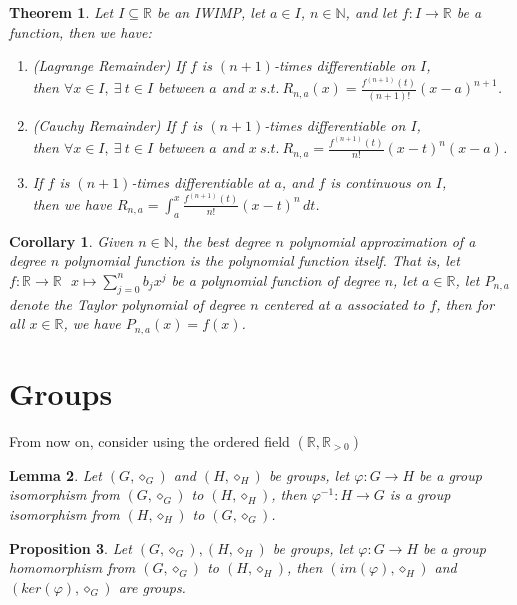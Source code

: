 \documentclass[11pt]{article}
\theoremstyle{break}
\theoremstyle{break}
\newtheorem{thm}{Theorem}[section]
\newtheorem{lem}{Lemma}[thm]
\newtheorem{prop}[lem]{Proposition}
\newtheorem{corT}[lem]{Corollary}
\newcommand{\R}{\mathbb{R}}
\newcommand{\N}{\mathbb{N}}
\begin{document}
	\begin{thm}
		Let $I \subseteq \R$ be an IWIMP, let $a \in I$, $n \in \N$, and let $f:I \to \R$ be a function, then we have:
		\begin{enumerate}[topsep=3pt,itemsep=-1ex,partopsep=1ex,parsep=1ex]
			\item  (Lagrange Remainder) If $f$ is $(n+1)$-times differentiable on $I$,\\ then $\forall x \in I, \ \exists \ t \in I$ between $a$ and $x \ s.t. \ R_{n,a}(x)=\frac{f^{(n+1)}(t)}{(n+1)!}(x-a)^{n+1}$.
			\item  (Cauchy Remainder) If $f$ is $(n+1)$-times differentiable on $I$,\\ then $\forall x \in I, \ \exists \ t \in I$ between $a$ and $x \ s.t. \ R_{n,a}=\frac{f^{(n+1)}(t)}{n!}(x-t)^n (x-a)$.
			\item If $f$ is $(n+1)$-times differentiable at $a$, and $f$ is continuous on $I$,\\ then we have $R_{n,a}=\int_a^x \frac{f^{(n+1)}(t)}{n!}(x-t)^n \, dt$.
		\end{enumerate}
	\end{thm}
	
	\begin{corT}
		Given $n \in \N$, the best degree $n$ polynomial approximation of a degree $n$ polynomial function is the polynomial function itself. That is, let $f:\R \to \R \ \ \  x\mapsto \sum_{j=0}^n b_j x^j$ be a polynomial function of degree $n$, let $a \in \R$, let $P_{n,a}$ denote the Taylor polynomial of degree $n$ centered at $a$ associated to $f$, then for all $x \in \R$, we have $P_{n,a}(x)=f(x)$.
	\end{corT}


\clearpage	
	
	
	
	
\section{\color{red} Groups}
	\color{red} \noindent From now on, consider using the ordered field $(\R,\R_{>0})$ \color{black}
	
	\begin{lem}
		Let $(G,\diamond_G)$ and $(H,\diamond_H)$ be groups, let $\varphi: G \to H$ be a group isomorphism from $(G,\diamond_G)$ to $(H,\diamond_H)$, then $\varphi^{-1}:H \to G$ is a group isomorphism from $(H,\diamond_H)$ to $(G,\diamond_G)$.
	\end{lem}
	
	\begin{prop}
		Let $(G,\diamond_G),(H,\diamond_H)$ be groups, let $\varphi :G \to H$ be a group homomorphism from $(G,\diamond_G)$ to $(H,\diamond_H)$, then $(im(\varphi),\diamond_H)$ and $(ker(\varphi),\diamond_G)$ are groups.
	\end{prop}
	
\end{document}
